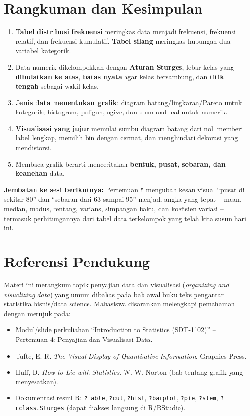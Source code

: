 \documentclass[
  indonesian,
  letterpaper,
]{book}
\providecommand{\tightlist}{%
  \setlength{\itemsep}{0pt}\setlength{\parskip}{0pt}}
\begin{document}
\section{Rangkuman dan Kesimpulan}\label{rangkuman-dan-kesimpulan-3}

\begin{enumerate}
\def\labelenumi{\arabic{enumi}.}
\tightlist
\item
  \textbf{Tabel distribusi frekuensi} meringkas data menjadi frekuensi,
  frekuensi relatif, dan frekuensi kumulatif. \textbf{Tabel silang}
  meringkas hubungan dua variabel kategorik.
\item
  Data numerik dikelompokkan dengan \textbf{Aturan Sturges}, lebar kelas
  yang \textbf{dibulatkan ke atas}, \textbf{batas nyata} agar kelas
  bersambung, dan \textbf{titik tengah} sebagai wakil kelas.
\item
  \textbf{Jenis data menentukan grafik}: diagram batang/lingkaran/Pareto
  untuk kategorik; histogram, poligon, ogive, dan stem-and-leaf untuk
  numerik.
\item
  \textbf{Visualisasi yang jujur} memulai sumbu diagram batang dari nol,
  memberi label lengkap, memilih bin dengan cermat, dan menghindari
  dekorasi yang mendistorsi.
\item
  Membaca grafik berarti menceritakan \textbf{bentuk, pusat, sebaran,
  dan keanehan} data.
\end{enumerate}

\textbf{Jembatan ke sesi berikutnya:} Pertemuan 5 mengubah kesan visual
``pusat di sekitar 80'' dan ``sebaran dari 63 sampai 95'' menjadi angka
yang tepat -- mean, median, modus, rentang, varians, simpangan baku, dan
koefisien variasi -- termasuk perhitungannya dari tabel data terkelompok
yang telah kita susun hari ini.

\section{Referensi Pendukung}\label{referensi-pendukung-3}

Materi ini merangkum topik penyajian data dan visualisasi
(\emph{organizing and visualizing data}) yang umum dibahas pada bab awal
buku teks pengantar statistika bisnis/data science. Mahasiswa disarankan
melengkapi pemahaman dengan merujuk pada:

\begin{itemize}
\tightlist
\item
  Modul/slide perkuliahan ``Introduction to Statistics (SDT-1102)'' --
  Pertemuan 4: Penyajian dan Visualisasi Data.
\item
  Tufte, E. R. \emph{The Visual Display of Quantitative Information}.
  Graphics Press.
\item
  Huff, D. \emph{How to Lie with Statistics}. W. W. Norton (bab tentang
  grafik yang menyesatkan).
\item
  Dokumentasi resmi R: \texttt{?table}, \texttt{?cut}, \texttt{?hist},
  \texttt{?barplot}, \texttt{?pie}, \texttt{?stem},
  \texttt{?nclass.Sturges} (dapat diakses langsung di R/RStudio).
\end{itemize}
\end{document}
